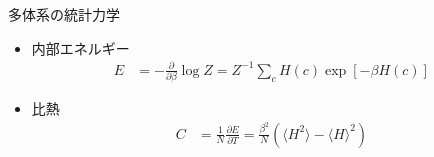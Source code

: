 \begin{frame}[t,fragile]{多体系の統計力学}
  \begin{itemize}
    \setlength{\itemsep}{1em}
  \item 内部エネルギー
    \begin{align*}
      E &= -\frac{\partial}{\partial\beta} \log Z = Z^{-1} \sum_c H(c) \exp [- \beta H(c) ]
    \end{align*}
  \item 比熱
    \begin{align*}
      C &= \frac{1}{N} \frac{\partial E}{\partial T} = \frac{\beta^2}{N} (\langle H^2 \rangle - \langle H \rangle^2)
    \end{align*}
  \end{itemize}
\end{frame}
